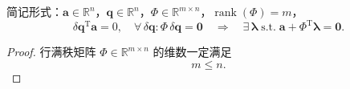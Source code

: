 \noindent 简记形式：$\boldsymbol{a} \in \mathbb{R}^n$，$\boldsymbol{q} \in \mathbb{R}^n$，$\Phi \in \mathbb{R}^{m \times n}$，$\operatorname{rank}(\Phi) = m$，
\begin{equation}\label{eq:1.24}
\delta\boldsymbol{q}^{\mathrm{T}} \boldsymbol{a} = 0, \quad \forall\, \delta\boldsymbol{q} : \Phi\,\delta\boldsymbol{q} = \boldsymbol{0} \quad \Rightarrow \quad \exists\, \boldsymbol{\lambda} \;\text{s.t.}\; \boldsymbol{a} + \Phi^{\mathrm{T}} \boldsymbol{\lambda} = \boldsymbol{0}.
\end{equation}

\begin{proof}
行满秩矩阵 $\Phi \in \mathbb{R}^{m \times n}$ 的维数一定满足
\begin{equation}\label{eq:1.25}
m \leq n.
\end{equation}


\end{proof}
